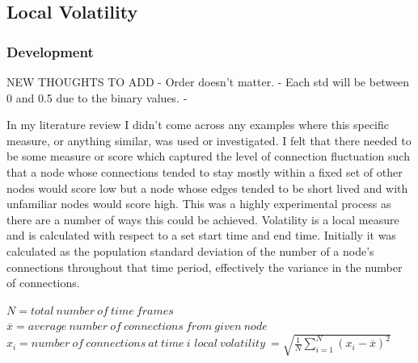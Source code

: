 



\subsection{Local Volatility}

\subsubsection{Development}

NEW THOUGHTS TO ADD
- Order doesn't matter.
- Each std will be between 0 and 0.5 due to the binary values.
- 

In my literature review I didn’t come across any examples where this specific measure, or anything similar, was used or investigated. I felt that there needed to be some measure or score which captured the level of connection fluctuation such that a node whose connections tended to stay mostly within a fixed set of other nodes would score low but a node whose edges tended to be short lived and with unfamiliar nodes would score high. This was a highly experimental process as there are a number of ways this could be achieved.
Volatility is a local measure and is calculated with respect to a set start time and end time. Initially it was calculated as the population standard deviation of the number of a node’s connections throughout that time period, effectively the variance in the number of connections.

\begin{center}
$N = total\ number\ of\ time\ frames$
$\overline{x} = average\ number\ of\ connections\ from\ given\ node $
$x_i = number\ of\ connections\ at\ time\ i$
$local\ volatility\ = \sqrt{\frac{1}{N} \sum_{i=1}^N (x_i - \overline{x})^2}$
\end{center}

